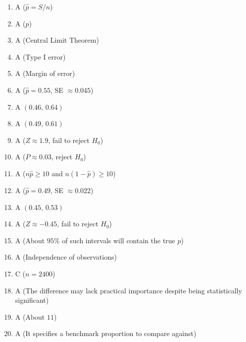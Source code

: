 \documentclass{article}
\begin{document}
\begin{enumerate}
\item A ($\hat{p}=S/n$)
\item A ($p$)
\item A (Central Limit Theorem)
\item A (Type I error)
\item A (Margin of error)
\item A ($\hat{p}=0.55$, SE $\approx0.045$)
\item A $(0.46,\,0.64)$
\item A $(0.49,\,0.61)$
\item A ($Z\approx1.9$, fail to reject $H_0$)
\item A ($P\approx0.03$, reject $H_0$)
\item A ($n\hat{p}\ge10$ and $n(1-\hat{p})\ge10$)
\item A ($\hat{p}=0.49$, SE $\approx0.022$)
\item A $(0.45,\,0.53)$
\item A ($Z\approx-0.45$, fail to reject $H_0$)
\item A (About $95\%$ of such intervals will contain the true $p$)
\item A (Independence of observations)
\item C ($n=2400$)
\item A (The difference may lack practical importance despite being statistically significant)
\item A (About $11$)
\item A (It specifies a benchmark proportion to compare against)
\end{enumerate}
\end{document}
